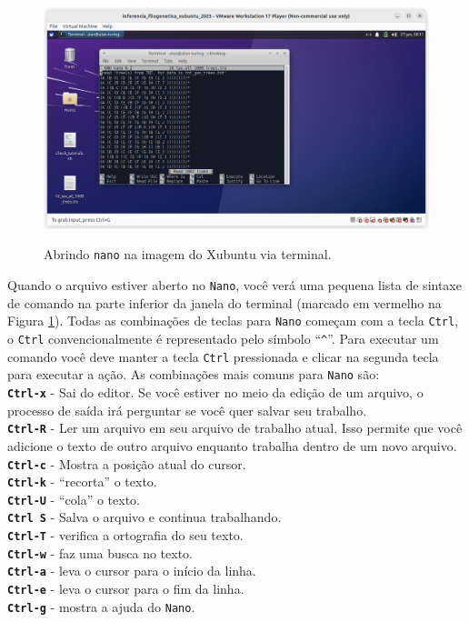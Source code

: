 \begin{refsection}
  \begin{figure}[H]
       \centering
      {\includegraphics[scale=0.35]{figures/tut2/nano.jpg}}
      {\caption[\textit{Abrindo \texttt{nano} }]{Abrindo \texttt{nano} na imagem do Xubuntu via terminal.}\label{tut2:fig:nano}}
  \end{figure}


Quando o arquivo estiver aberto no \texttt{Nano}, você verá uma pequena lista de sintaxe de comando na parte inferior da janela do terminal (marcado em vermelho na Figura \ref{tut2:fig:nano}). Todas as combinações de teclas para \texttt{Nano} começam com a tecla \texttt{Ctrl}, o \texttt{Ctrl} convencionalmente é representado pelo símbolo ``\texttt{\^{}}''. Para executar um comando você deve manter a tecla \texttt{Ctrl} pressionada e clicar na segunda tecla para executar a ação. As combinações mais comuns para \texttt{Nano} são:\\

\noindent\textbf{\texttt{Ctrl-x}} - Sai do editor. Se você estiver no meio da edição de um arquivo, o processo de saída irá perguntar se você quer salvar seu trabalho.\\
\textbf{\texttt{Ctrl-R}} - Ler um arquivo em seu arquivo de trabalho atual. Isso permite que você adicione o texto de outro arquivo enquanto trabalha dentro de um novo arquivo.\\
\textbf{\texttt{Ctrl-c}} - Mostra a posição atual do cursor.\\
\textbf{\texttt{Ctrl-k}} - ``recorta'' o texto.\\
\textbf{\texttt{Ctrl-U}} - ``cola'' o texto.\\
\textbf{\texttt{Ctrl S}} - Salva o arquivo e continua trabalhando.\\
\textbf{\texttt{Ctrl-T}} - verifica a ortografia do seu texto.\\
\textbf{\texttt{Ctrl-w}} - faz uma busca no texto.\\
\textbf{\texttt{Ctrl-a}} - leva o cursor para o início da linha.\\
\textbf{\texttt{Ctrl-e}} - leva o cursor para o fim da linha.\\
\textbf{\texttt{Ctrl-g}} - mostra a ajuda do \texttt{Nano}.\\


\end{refsection}
